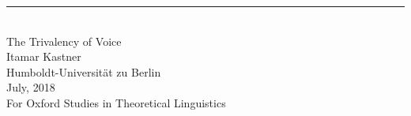 \singlespacing
\begin{center}
\rule{165pt}{0pt} \\
\vspace{1cm}
\LARGE{The Trivalency of Voice}\\
\vspace{2cm}
\large{Itamar Kastner} \\
\vspace{0.4cm}
\normalsize{Humboldt-Universit\"at zu Berlin} \\
\vspace{1cm}
\normalsize{July, 2018} \\
\vspace{4cm}
\hfill \large{For Oxford Studies in Theoretical Linguistics}\\

\end{center}